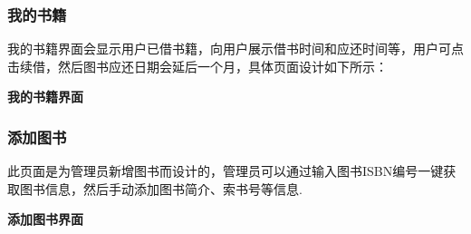 \documentclass{article}
\begin{document}
\subsubsection{我的书籍}
我的书籍界面会显示用户已借书籍，向用户展示借书时间和应还时间等，用户可点击续借，然后图书应还日期会延后一个月，具体页面设计如下所示：

\begin{center}
\textbf{我的书籍界面}
\end{center}


\subsubsection{添加图书}
此页面是为管理员新增图书而设计的，管理员可以通过输入图书ISBN编号一键获取图书信息，然后手动添加图书简介、索书号等信息.

\begin{center}
\textbf{添加图书界面}
\end{center}
\end{document}
